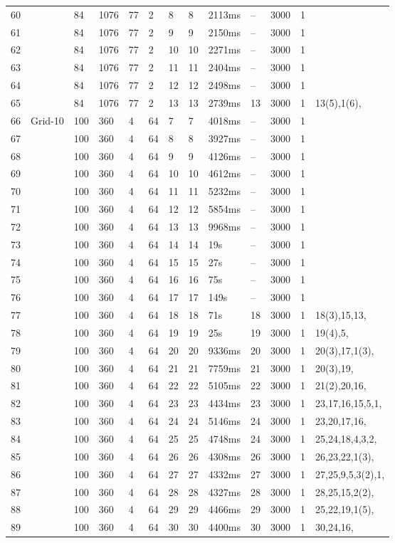 \documentclass{article}
\begin{document}
\begin{longtable}{|l |l |l |l |l |l |l |l |l |l |l |l |l |}
60&&84&1076&77&2&8&8&2113ms&--&3000&1&\\
61&&84&1076&77&2&9&9&2150ms&--&3000&1&\\
62&&84&1076&77&2&10&10&2271ms&--&3000&1&\\
63&&84&1076&77&2&11&11&2404ms&--&3000&1&\\
64&&84&1076&77&2&12&12&2498ms&--&3000&1&\\
65&&84&1076&77&2&13&13&2739ms&13&3000&1&13(5),1(6),\\
66&Grid-10&100&360&4&64&7&7&4018ms&--&3000&1&\\
67&&100&360&4&64&8&8&3927ms&--&3000&1&\\
68&&100&360&4&64&9&9&4126ms&--&3000&1&\\
69&&100&360&4&64&10&10&4612ms&--&3000&1&\\
70&&100&360&4&64&11&11&5232ms&--&3000&1&\\
71&&100&360&4&64&12&12&5854ms&--&3000&1&\\
72&&100&360&4&64&13&13&9968ms&--&3000&1&\\
73&&100&360&4&64&14&14&19s&--&3000&1&\\
74&&100&360&4&64&15&15&27s&--&3000&1&\\
75&&100&360&4&64&16&16&75s&--&3000&1&\\
76&&100&360&4&64&17&17&149s&--&3000&1&\\
77&&100&360&4&64&18&18&71s&18&3000&1&18(3),15,13,\\
78&&100&360&4&64&19&19&25s&19&3000&1&19(4),5,\\
79&&100&360&4&64&20&20&9336ms&20&3000&1&20(3),17,1(3),\\
80&&100&360&4&64&21&21&7759ms&21&3000&1&20(3),19,\\
81&&100&360&4&64&22&22&5105ms&22&3000&1&21(2),20,16,\\
82&&100&360&4&64&23&23&4434ms&23&3000&1&23,17,16,15,5,1,\\
83&&100&360&4&64&24&24&5146ms&24&3000&1&23,20,17,16,\\
84&&100&360&4&64&25&25&4748ms&24&3000&1&25,24,18,4,3,2,\\
85&&100&360&4&64&26&26&4308ms&26&3000&1&26,23,22,1(3),\\
86&&100&360&4&64&27&27&4332ms&27&3000&1&27,25,9,5,3(2),1,\\
87&&100&360&4&64&28&28&4327ms&28&3000&1&28,25,15,2(2),\\
88&&100&360&4&64&29&29&4466ms&29&3000&1&25,22,19,1(5),\\
89&&100&360&4&64&30&30&4400ms&30&3000&1&30,24,16,\\

\end{longtable}
\end{document}
